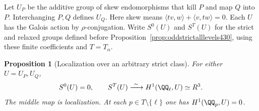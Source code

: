 \documentclass[a4paper,11pt]{article}
\newtheorem{proposition}{Proposition}[section]
\theoremstyle{definition}
\theoremstyle{remark}
\numberwithin{equation}{section}
\begin{document}
Let \(U_P\) be the additive group of skew endomorphisms that
kill \(P\) and map \(Q\) into \(P\). Interchanging \(P,Q\)
defines \(U_Q\). Here skew means
\(\langle tv,w\rangle+\langle v,tw\rangle=0\).
Each \(U\) has the Galois action by \(\rho\)-conjugation.
Write \(S^0(U)\) and \(S^T(U)\) for the strict and relaxed
groups defined before Proposition~\ref{prop:oddstrictalllevels430},
using these finite coefficients and \(T=T_\alpha\).

\begin{proposition}[Localization over an arbitrary strict class]\leavevmode
\label{prop:siegellocalization431}
For either \(U=U_P,U_Q\),
\[
          S^0(U)=0,\qquad
          S^T(U)\xrightarrow{\ \sim\ }H^1(\QQ_\ell,U)
                      \simeq R^3 .
\]
The middle map is localization. At each \(p\in T\setminus\{\ell\}\)
one has \(H^1(\QQ_p,U)=0\).
\end{proposition}
\end{document}
